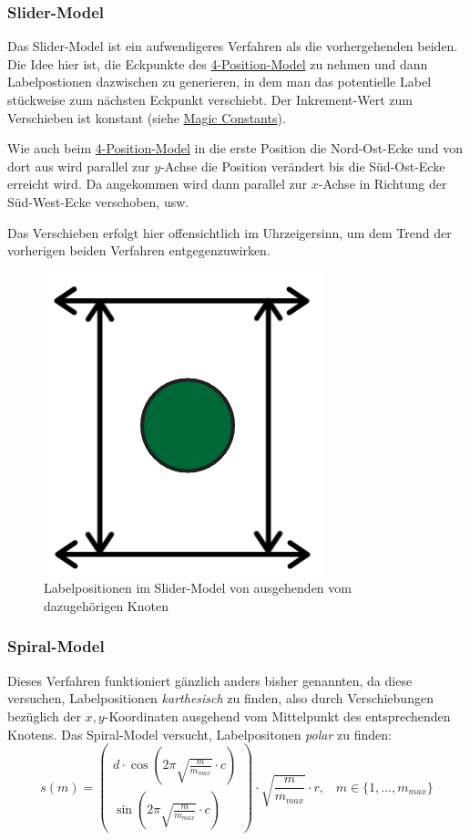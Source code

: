 \subsubsection{Slider-Model}
\label{subsubsec:slider}
Das Slider-Model ist ein aufwendigeres Verfahren als die vorhergehenden beiden. Die Idee hier ist, die Eckpunkte des \hyperref[subsubsec:4pos]{4-Position-Model} zu nehmen
und dann Labelpostionen dazwischen zu generieren, in dem man das potentielle Label stückweise zum nächsten Eckpunkt verschiebt. Der Inkrement-Wert zum Verschieben ist konstant (siehe \hyperref[subsec:consts]{Magic Constants}).

Wie auch beim \hyperref[subsubsec:4pos]{4-Position-Model} in die erste Position die Nord-Ost-Ecke und von dort aus wird parallel zur $y$-Achse die Position verändert bis die Süd-Ost-Ecke erreicht wird.
Da angekommen wird dann parallel zur $x$-Achse in Richtung der Süd-West-Ecke verschoben, usw.

Das Verschieben erfolgt hier offensichtlich im Uhrzeigersinn, um dem Trend der vorherigen beiden Verfahren entgegenzuwirken.

\begin{figure}[H]
    \centering
    \includegraphics[scale=0.55]{../img/slider}
    \caption{Labelpositionen im Slider-Model von ausgehenden vom dazugehörigen Knoten}
    \label{fig:slider}
\end{figure}

\subsubsection{Spiral-Model}
\label{subsubsec:spiral}

Dieses Verfahren funktioniert gänzlich anders bisher genannten, da diese versuchen, Labelpositionen \textit{karthesisch} zu finden, also durch Verschiebungen
bezüglich der $x,y$-Koordinaten ausgehend vom Mittelpunkt des entsprechenden Knotens. Das Spiral-Model versucht, Labelpositonen \textit{polar} zu finden:
$$ s(m) =
    \left(\begin{array}{c}
              d \cdot \cos (2 \pi \sqrt{\frac{m}{m_{max}}} \cdot c) \\
    \sin (2 \pi \sqrt{\frac{m}{m_{max}}} \cdot c)\end{array}\right) \cdot \sqrt{\frac{m}{m_{max}}} \cdot r,\; \; \; m \in \{1, \dots, m_{max} \}
$$

